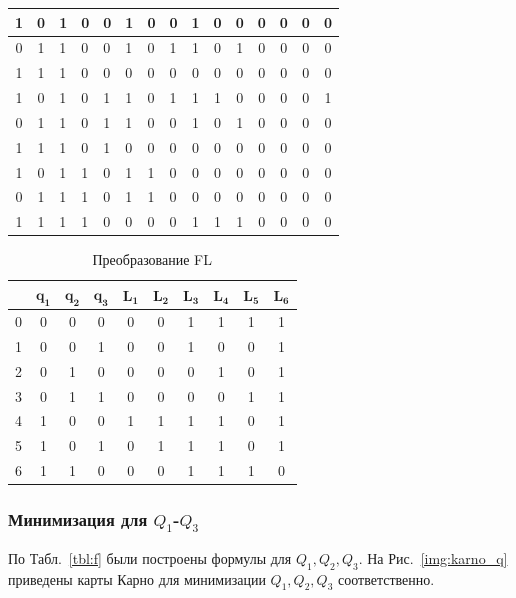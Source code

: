 \documentclass[a4paper, final]{article}
\begin{document}
\begin{table}[h!]
\begin{tabularx}{\textwidth}{|c|c|X|X|X||X|X|X|c|c|c||c|c|c|c|}
  1 & 0 &   1 & 0 & 0 &  1 & 0 & 0 &  1 & 0 & 0 &  0 & 0 & 0 & 0\\
  \hline
  0 & 1 &   1 & 0 & 0 &  1 & 0 & 1 &  1 & 0 & 1 &  0 & 0 & 0 & 0\\
  \hline
  1 & 1 &   1 & 0 & 0 &  0 & 0 & 0 &  0 & 0 & 0 &  0 & 0 & 0 & 0\\
  \hline

  1 & 0 &   1 & 0 & 1 &  1 & 0 & 1 &  1 & 1 & 0 &  0 & 0 & 0 & 1\\
  \hline
  0 & 1 &   1 & 0 & 1 &  1 & 0 & 0 &  1 & 0 & 1 &  0 & 0 & 0 & 0\\
  \hline
  1 & 1 &   1 & 0 & 1 &  0 & 0 & 0 &  0 & 0 & 0 &  0 & 0 & 0 & 0\\
  \hline

  1 & 0 &   1 & 1 & 0 &  1 & 1 & 0 &  0 & 0 & 0 &  0 & 0 & 0 & 0\\
  \hline
  0 & 1 &   1 & 1 & 0 &  1 & 1 & 0 &  0 & 0 & 0 &  0 & 0 & 0 & 0\\
  \hline
  1 & 1 &   1 & 1 & 0 &  0 & 0 & 0 &  1 & 1 & 1 &  0 & 0 & 0 & 0\\
  \hline
  \end{tabularx}
\end{table}

\begin{table}[h!]
  \centering
  \caption{Преобразование FL}
  \label{tbl:fl}
  \footnotesize
  \begin{tabular}{|c||c|c|c||c|c|c|c|c|c|}
  \hline
      & $\mathbf{q_1}$& $\mathbf{q_2}$ & $\mathbf{q_3}$ & $\mathbf{L_1}$ & $\mathbf{L_2}$ & $\mathbf{L_3}$ & $\mathbf{L_4}$ & $\mathbf{L_5}$ & $\mathbf{L_6}$ \\
  \hline
  \hline
  0   & 0 & 0 & 0   & 0 & 0 & 1 & 1 & 1 & 1 \\
  \hline
  1   & 0 & 0 & 1   & 0 & 0 & 1 & 0 & 0 & 1 \\
  \hline
  2   & 0 & 1 & 0   & 0 & 0 & 0 & 1 & 0 & 1 \\
  \hline
  3   & 0 & 1 & 1   & 0 & 0 & 0 & 0 & 1 & 1 \\
  \hline
  4   & 1 & 0 & 0   & 1 & 1 & 1 & 1 & 0 & 1 \\
  \hline
  5   & 1 & 0 & 1   & 0 & 1 & 1 & 1 & 0 & 1 \\
  \hline
  6   & 1 & 1 & 0   & 0 & 0 & 1 & 1 & 1 & 0 \\
  \hline
  \end{tabular}
\end{table}

\newpage
\subsubsection{Минимизация для $Q_1$-$Q_3$}
По Табл.~\ref{tbl:f} были построены формулы для $Q_1, Q_2, Q_3$. На Рис.~\ref{img:karno_q} приведены карты Карно для минимизации $Q_1, Q_2, Q_3$ соответственно.
\end{document}
